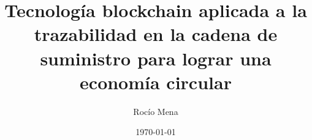 \documentclass{article}
\title{Tecnología blockchain aplicada a la trazabilidad en la cadena de suministro para lograr una economía circular}
\author{Rocío Mena}
\date{\today}
\begin{document}
\maketitle













\nocite{*} %

\printbibliography %
\end{document}
